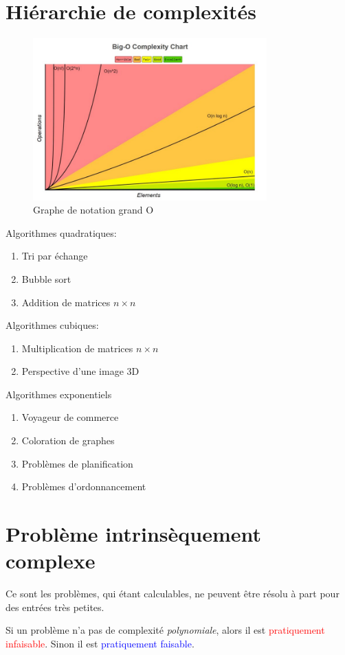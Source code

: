 \documentclass{report}
\begin{document}
\section{Hiérarchie de complexités}
\begin{figure}[H]
\centering
\includegraphics[width=9cm]{img/BigO.jpeg}
\caption{Graphe de notation grand O}
\end{figure}
Algorithmes quadratiques:
\begin{enumerate}
\item Tri par échange
\item Bubble sort
\item Addition de matrices $n\times n$
\end{enumerate}
Algorithmes cubiques:
\begin{enumerate}
\item Multiplication de matrices $n \times n$
\item Perspective d'une image 3D
\end{enumerate}

Algorithmes exponentiels
\begin{enumerate}
\item Voyageur de commerce
\item Coloration de graphes
\item Problèmes de planification
\item Problèmes d'ordonnancement 
\end{enumerate}

\section{Problème intrinsèquement complexe}
Ce sont les problèmes, qui étant calculables, ne peuvent être résolu à part pour des entrées très petites.\par
Si un problème n'a pas de complexité \textit{polynomiale}, alors il est \textcolor{red}{pratiquement infaisable}. Sinon il est \textcolor{blue}{pratiquement faisable}.\\
\end{document}
